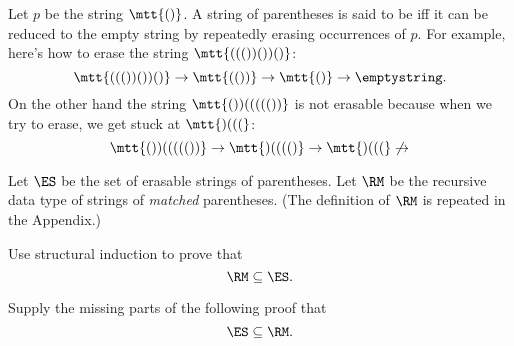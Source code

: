 
\inhandout{
\decideaboutsolutions
\usesimpleproblems
}


\begin{problem}
%
Let $p$ be the string $\mtt{()}$.  A string of parentheses is said to be
 iff it can be reduced to the empty string by repeatedly
erasing occurrences of $p$.  For example, here's how to erase the string
$\mtt{((())())()}$:
\[
\mtt{((())())()}
\rightarrow \mtt{(())}
\rightarrow \mtt{()}
\rightarrow \emptystring.
\]
On the other hand the string $\mtt{())((((())}$ is not erasable because
when we try to erase, we get stuck at $\mtt{)(((}$:
\[
\mtt{())((((())}
\rightarrow \mtt{)(((()}
\rightarrow \mtt{)(((}
\not\rightarrow
\]

Let $\ES$ be the set of erasable strings of parentheses.  Let $\RM$ be the
recursive data type of strings of \emph{matched} parentheses.  (The
definition of $\RM$ is repeated in the Appendix.)

\bparts

\ppart Use structural induction to prove that
\[
\RM \subseteq \ES.
\]


\ppart\label{RMES} Supply the missing parts of the following proof that
\[
\ES \subseteq \RM.
\]


\end{problem}
